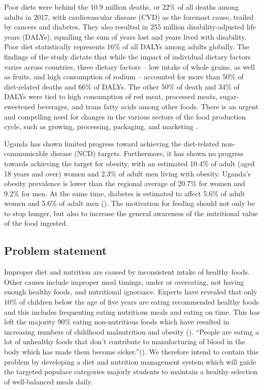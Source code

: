 \documentclass{article}
\begin{document}
Poor diets were behind the 10.9 million deaths, or 22\% of all deaths among adults in 2017, with cardiovascular disease (CVD) as the foremost cause, trailed by cancers and diabetes. They also resulted in 255 million disability-adjusted life years (DALYs), equalling the sum of years lost and years lived with disability. Poor diet statistically represents 16\% of all DALYs among adults globally. The findings of the study dictate that while the impact of individual dietary factors varies across countries, three dietary factors – low intake of whole grains, as well as fruits, and high consumption of sodium – accounted for more than 50\% of diet-related deaths and 66\% of DALYs. The other 50\% of death and 34\% of DALYs were tied to high consumption of red meat, processed meats, sugar-sweetened beverages, and trans fatty acids among other foods. There is an urgent and compelling need for changes in the various sectors of the food production cycle, such as growing, processing, packaging, and marketing \cite{ihme2019new}.

Uganda has shown limited progress toward achieving the diet-related non-communicable disease (NCD) targets. Furthermore, it has shown no progress towards achieving the target for obesity, with an estimated 10.4\% of adult (aged 18 years and over) women and 2.3\% of adult men living with obesity. Uganda's obesity prevalence is lower than the regional average of 20.7\% for women and 9.2\% for men. At the same time, diabetes is estimated to affect 5.6\% of adult women and 5.6\% of adult men (\cite{globalnutritionreportn.d.}). The motivation for feeding should not only be to stop hunger, but also to increase the general awareness of the nutritional value of the food ingested.

\subsection{Problem statement}
Improper diet and nutrition are caused by inconsistent intake of healthy foods. Other causes include improper meal timings, under or overeating, not having enough healthy foods, and nutritional ignorance. Experts have revealed that only 10\% of children below the age of five years are eating recommended healthy foods and this includes frequenting eating nutritious meals and eating on time. This has left the majority 90\% eating non-nutritious foods which have resulted in increasing numbers of childhood malnutrition and obesity (\cite{tumwine2022only}). “People are eating a lot of unhealthy foods that don’t contribute to manufacturing of blood in the body which has made them become sicker.”(\cite{tumwine2022only}). We therefore intend to contain this problem by developing a diet and nutrition management system which will guide the targeted populace categories majorly students to maintain a healthy selection of well-balanced meals daily.
\end{document}
